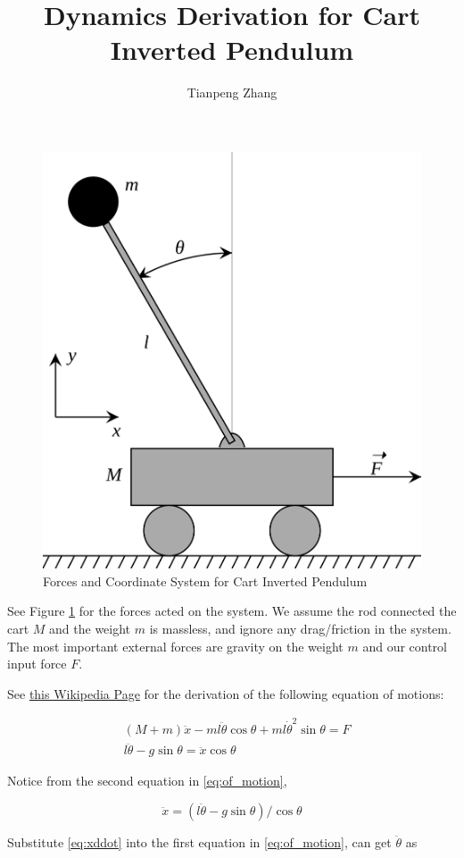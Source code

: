 \documentclass[]{article}
\title{Dynamics Derivation for Cart Inverted Pendulum}
\author{Tianpeng Zhang}
\begin{document}
\maketitle

\begin{figure}[!ht]
	\centering
	\includegraphics[width=0.5\linewidth]{Cart-pendulum}
	\caption{Forces and Coordinate System for Cart Inverted Pendulum}
	\label{fig:cart-pendulum}
\end{figure}

See Figure \ref{fig:cart-pendulum} for the forces acted on the system. We assume the rod connected the cart $M$ and the weight $m$ is massless, and ignore any drag/friction in the system. The most important external forces are gravity on the weight $m$ and our control input force $F$.


See \href{https://en.wikipedia.org/wiki/Inverted_pendulum#Inverted_pendulum_on_a_cart}{this Wikipedia Page} for the derivation of the following equation of motions:

\begin{equation}\label{eq:of_motion}
	\begin{split}
	&(M+m)\ddot{x} - ml\ddot{\theta}\cos\theta + ml\dot{\theta}^2\sin\theta = F\\
	&l\ddot{\theta}-g\sin\theta = \ddot{x}\cos\theta
	\end{split}
\end{equation}
 

Notice from the second equation in \eqref{eq:of_motion}, 

\begin{equation}\label{eq:xddot}
	\ddot{x} = (l\ddot{\theta}-g\sin\theta )/\cos\theta
\end{equation}

Substitute \eqref{eq:xddot} into the first equation in \eqref{eq:of_motion}, can get $\ddot{\theta}$ as
\end{document}

